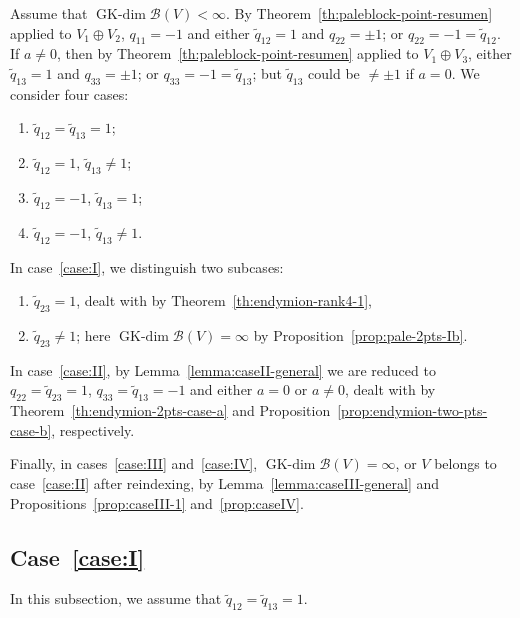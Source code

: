\documentclass[10pt,a4paper]{amsart}
\numberwithin{equation}{section}
\newcommand{\GK}{\operatorname{GK-dim}}
\newcommand{\toba}{\mathscr B}
\begin{document}
Assume that $\GK \toba(V) < \infty$.
By Theorem~\ref{th:paleblock-point-resumen} applied to $V_1 \oplus V_2$, $q_{11} = -1$ and
either $\widetilde{q}_{12} = 1$ and $q_{22} = \pm 1$; or $q_{22} = -1 = \widetilde{q}_{12}$.
If $a\neq 0$, then by Theorem~\ref{th:paleblock-point-resumen} applied to $V_1 \oplus V_3$, either
$\widetilde{q}_{13} = 1$ and $q_{33} = \pm 1$; or $q_{33} = -1 = \widetilde{q}_{13}$;
but $\widetilde{q}_{13}$ could be $\neq \pm 1$ if $a = 0$.
We consider four cases:
\begin{enumerate}[label=(\rm{\Roman*)}]
\item\label{case:I} $\widetilde{q}_{12}= \widetilde{q}_{13}=1$;

\item\label{case:II} $\widetilde{q}_{12}=1$, $\widetilde{q}_{13} \neq 1$;

\item\label{case:III} $\widetilde{q}_{12}=-1$, $\widetilde{q}_{13}=1$;

\item\label{case:IV} $\widetilde{q}_{12}=-1$, $\widetilde{q}_{13} \neq 1$.
\end{enumerate}

In case~\ref{case:I}, we distinguish two subcases:{\samepage
\begin{enumerate}[label=$(\alph*)$]\itemsep=0pt
\item\label{case:Ia} $\widetilde{q}_{23}=1$, dealt with by Theorem~\ref{th:endymion-rank4-1},

\item\label{case:Ib} $\widetilde{q}_{23} \neq 1$; here $\GK \toba(V) = \infty$ by Proposition~\ref{prop:pale-2pts-Ib}.
\end{enumerate}}

In case~\ref{case:II}, by Lemma~\ref{lemma:caseII-general} we are reduced to
$q_{22} = \widetilde{q}_{23} = 1$, $q_{33} = \widetilde{q}_{13} = -1$ and
either $a = 0$ or
$a \neq 0$, dealt with by Theorem~\ref{th:endymion-2pts-case-a} and Proposition~\ref{prop:endymion-two-pts-case-b},
respectively.

Finally, in cases~\ref{case:III} and~\ref{case:IV}, $\GK \toba(V) = \infty$, or $V$ belongs to case~\ref{case:II} after reindexing,
by Lemma~\ref{lemma:caseIII-general} and
Propositions~\ref{prop:caseIII-1} and~\ref{prop:caseIV}.

\subsection[Case~(I)]{Case~\ref{case:I}}
In this subsection, we assume that $\widetilde{q}_{12}= \widetilde{q}_{13}=1$.
\end{document}
